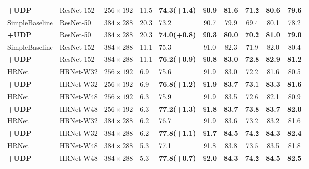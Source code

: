 \documentclass[10pt,journal,compsoc]{IEEEtran}
\begin{document}
\begin{table*}
\begin{center}
\begin{tabular}{l|l|c|l|lccccc}
\textbf{+UDP}              & ResNet-152       &$256\times192$    &11.5&\textbf{74.3(+1.4)}  &\textbf{90.9}     &\textbf{81.6}    &\textbf{71.2}   &\textbf{80.6}   &\textbf{79.6}\\
SimpleBaseline\cite{SBNet} & ResNet-50        &$384\times288$    &20.3&73.2             & 90.7      & 79.9      & 69.4     &80.1     &78.2\\
\textbf{+UDP}              & ResNet-50        &$384\times288$    &20.3&\textbf{74.0(+0.8)}  &\textbf{90.3}   &\textbf{ 80.0}    &\textbf{ 70.2}  &\textbf{81.0}   &\textbf{79.0}\\
SimpleBaseline\cite{SBNet} & ResNet-152       &$384\times288$    &11.1&75.3             & 91.0      & 82.3      & 71.9    &82.0      &80.4\\
\textbf{+UDP}              & ResNet-152       &$384\times288$    &11.1&\textbf{76.2(+0.9)}  &\textbf{90.8}    &\textbf{ 83.0}   &\textbf{ 72.8}  &\textbf{82.9}    &\textbf{81.2}\\
\hline
HRNet\cite{HRNet}          & HRNet-W32        &$256\times192$    &6.9&75.6             & 91.9         & 83.0       & 72.2     &81.6     &80.5\\
\textbf{+UDP}              & HRNet-W32        &$256\times192$    &6.9&\textbf{76.8(+1.2)} & \textbf{91.9}       &\textbf{83.7}     & \textbf{73.1}   &\textbf{83.3}   &\textbf{81.6}\\
HRNet\cite{HRNet}          & HRNet-W48        &$256\times192$    &6.3&75.9               & 91.9        & 83.5       & 72.6     &82.1      &80.9\\
\textbf{+UDP }             & HRNet-W48        &$256\times192$    &6.3&\textbf{77.2(+1.3)}  &\textbf{ 91.8}      & \textbf{83.7}    &\textbf{73.8}    &\textbf{83.7}    &\textbf{82.0}\\
HRNet\cite{HRNet}          & HRNet-W32        &$384\times288$    &6.2&76.7             & 91.9       & 83.6       & 73.2     &83.2      &81.6\\
\textbf{+UDP}              & HRNet-W32        &$384\times288$    &6.2&\textbf{77.8(+1.1)} & \textbf{91.7}    & \textbf{84.5}     & \textbf{74.2}   &\textbf{84.3}   &\textbf{82.4}\\
HRNet\cite{HRNet}          & HRNet-W48        &$384\times288$    &5.3&77.1              & 91.8      & 83.8       & 73.5      &83.5     &81.8\\
\textbf{+UDP }             & HRNet-W48        &$384\times288$    &5.3&\textbf{77.8(+0.7)} & \textbf{92.0}     &\textbf{84.3}      &\textbf{74.2}    &\textbf{84.5}   &\textbf{82.5}\\
\hline



\hline
\end{tabular}
\end{center}

\end{table*}
\end{document}
